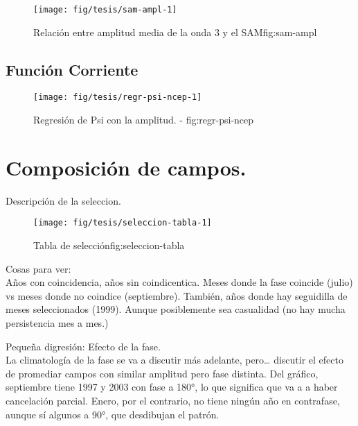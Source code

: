 \documentclass[spanish,a4paper]{book}
\begin{document}
\begin{figure}
\texttt{[image: fig/tesis/sam-ampl-1]} \caption{Relación entre amplitud media de la onda 3 y el SAM{fig:sam-ampl}}\label{fig:sam-ampl}
\end{figure}

\subsection{Función Corriente}\label{funcion-corriente-1}

\begin{figure}

{\centering \texttt{[image: fig/tesis/regr-psi-ncep-1]} 

}

\caption{Regresión de Psi con la amplitud. - fig:regr-psi-ncep}\label{fig:regr-psi-ncep}
\end{figure}

\section{Composición de campos.}\label{composicion-de-campos.}

Descripción de la seleccion.

\begin{figure}

{\centering \texttt{[image: fig/tesis/seleccion-tabla-1]} 

}

\caption{Tabla de selección{fig:seleccion-tabla}}\label{fig:seleccion-tabla}
\end{figure}

Cosas para ver:\\
Años con coincidencia, años sin coindicentica. Meses donde la fase
coincide (julio) vs meses donde no coindice (septiembre). También, años
donde hay seguidilla de meses seleccionados (1999). Aunque posiblemente
sea casualidad (no hay mucha persistencia mes a mes.)

Pequeña digresión: Efecto de la fase.\\
La climatología de la fase se va a discutir más adelante, pero\ldots{}
discutir el efecto de promediar campos con similar amplitud pero fase
distinta. Del gráfico, septiembre tiene 1997 y 2003 con fase a 180°, lo
que significa que va a a haber cancelación parcial. Enero, por el
contrario, no tiene ningún año en contrafase, aunque sí algunos a 90°,
que desdibujan el patrón.
\end{document}
